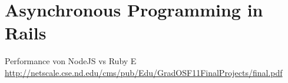 \section{Asynchronous Programming in Rails}
\label{section: Asynchronous Programming in Rails}


Performance von NodeJS vs Ruby E
\url{http://netscale.cse.nd.edu/cms/pub/Edu/GradOSF11FinalProjects/final.pdf}
